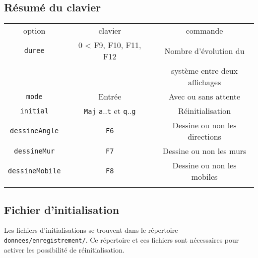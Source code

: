 \subsection{Résumé du clavier}
\begin{center}
\begin{tabular}{ccccc}
option & & clavier &  & commande \\
\texttt{duree} &  & 0 < {\sf F9}, {\sf F10}, {\sf F11}, {\sf F12} &  & Nombre d'évolution du \\
 &  &  &  & système entre deux affichages \\
\texttt{mode} &  & {\sf Entrée} &  & Avec ou sans attente \\
%
\texttt{initial} &  & \texttt{Maj} \texttt{a}..\texttt{t} et \texttt{q}..\texttt{g} &  & Réinitialisation \\
\texttt{dessineAngle} &  & \texttt{F6} &  & Dessine ou non les directions \\
\texttt{dessineMur} &  & \texttt{F7} &  & Dessine ou non les murs \\
\texttt{dessineMobile} &  & \texttt{F8} &  & Dessine ou non les mobiles \\

\\
\end{tabular}
\end{center}
%
\subsection{Fichier d'initialisation}
%
Les fichiers d'initialisations se trouvent dans le répertoire \texttt{donnees/enregistrement/}. Ce répertoire et ces fichiers sont nécessaires pour activer les possibilité de réinitialisation.
%
